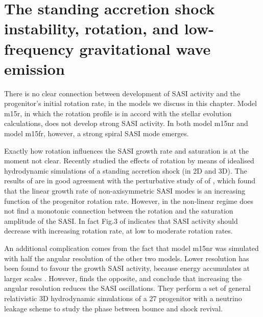 \section{The standing accretion shock instability, rotation, and low-frequency gravitational wave emission}
There is no clear connection between development of SASI activity and the progenitor's initial rotation rate,
in the models we discuss in this chapter. Model m15r, in which the rotation profile is in accord with the stellar
evolution calculations, does not develop strong SASI activity. In both model m15nr and model m15fr, however, a strong spiral SASI mode emerges. 

Exactly how rotation influences the SASI growth rate and saturation is 
at the moment not clear. Recently \cite{blondin_17} studied the effects of rotation by means of idealised hydrodynamic simulations of a standing accretion shock (in 2D and 3D). The results of \cite{blondin_17} are in good agreement with the perturbative study of of \cite{yamasaki_08}, which found that the linear growth rate 
of non-axisymmetric SASI modes is an increasing function of the progenitor rotation rate.
However, in the non-linear regime \cite{kazeroni_17} does not find a monotonic connection between the
rotation and the saturation amplitude of the SASI. In fact Fig.3 of \cite{kazeroni_17} indicates that
SASI activity should decrease with increasing rotation rate, at low to moderate rotation rates. 

An additional complication comes from the fact that model m15nr was simulated with 
half the angular resolution of the other two models. Lower resolution has been found
to favour the growth SASI activity, because energy accumulates at larger scales \citep{hanke_12}.
However, \cite{abdikamalov_15} finds the opposite, and conclude that increasing the angular resolution 
reduces the SASI oscillations. They perform a set of general relativistic 3D hydrodynamic
simulations of a 27 \msun progenitor with a neutrino leakage scheme to study the phase between bounce and
shock revival.



